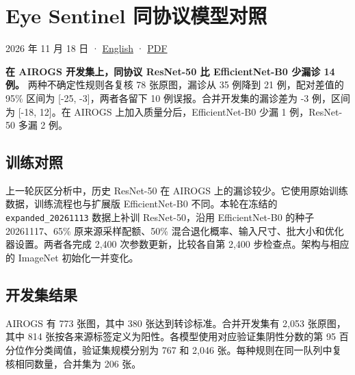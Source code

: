 \documentclass[
  10pt,
]{article}
\author{}
\date{}
\begin{document}
\section{Eye Sentinel
同协议模型对照}\label{eye-sentinel-ux540cux534fux8baeux6a21ux578bux5bf9ux7167}

2026 年 11 月 18 日 · \href{backbone-comparison.en.md}{English} ·
\href{backbone-comparison.zh.pdf}{PDF}

\textbf{在 AIROGS 开发集上，同协议 ResNet-50 比 EfficientNet-B0 少漏诊
14 例。} 两种不确定性规则各复核 78 张原图，漏诊从 35 例降到 21
例，配对差值的 95\% 区间为 {[}-25, -3{]}，两者各留下 10
例误报。合并开发集的漏诊差为 -3 例，区间为 {[}-18, 12{]}。在 AIROGS
上加入质量分后，EfficientNet-B0 少漏 1 例，ResNet-50 多漏 2 例。

\subsection{训练对照}\label{ux8badux7ec3ux5bf9ux7167}

上一轮灰区分析中，历史 ResNet-50 在 AIROGS
上的漏诊较少。它使用原始训练数据，训练流程也与扩展版 EfficientNet-B0
不同。本轮在冻结的 \texttt{expanded\_20261113} 数据上补训
ResNet-50，沿用 EfficientNet-B0 的种子 20261117、65\%
原来源采样配额、50\%
混合退化概率、输入尺寸、批大小和优化器设置。两者各完成 2,400
次参数更新，比较各自第 2,400 步检查点。架构与相应的 ImageNet
初始化一并变化。

\subsection{开发集结果}\label{ux5f00ux53d1ux96c6ux7ed3ux679c}

AIROGS 有 773 张图，其中 380 张达到转诊标准。合并开发集有 2,053
张原图，其中 814
张按各来源标签定义为阳性。各模型使用对应验证集阴性分数的第 95
百分位作分类阈值，验证集规模分别为 767 和 2,046
张。每种规则在同一队列中复核相同数量，合并集为 206 张。
\end{document}
